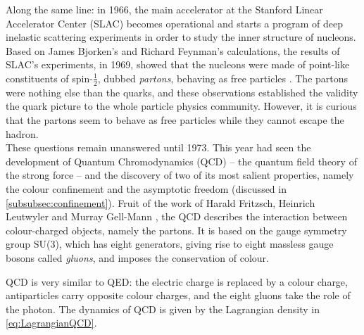 Along the same line: in 1966, the main accelerator at the Stanford Linear Accelerator Center (SLAC) becomes operational and starts a program of deep inelastic scattering experiments in order to study the inner structure of nucleons. Based on James Bjorken's \cite{bjorkenCurrentAlgebraSmall2018} and Richard Feynman's  \cite{feynmanBehaviorHadronCollisions1988} calculations, the results of SLAC's experiments, in 1969, showed that the nucleons were made of point-like constituents of spin-$\frac{1}{2}$, dubbed \textit{partons}, behaving as free particles \cite{peskinIntroductionQuantumField2018}. The partons were nothing else than the quarks, and these observations established the validity the quark picture to the whole particle physics community. However, it is curious that the partons seem to behave as free particles while they cannot escape the hadron.\\

These questions remain unanswered until 1973. This year had seen the development of Quantum Chromodynamics (QCD) -- the quantum field theory of the strong force -- and the discovery of two of its most salient properties, namely the colour confinement and the asymptotic freedom (discussed in \Sec\ref{subsubsec:confinement}). Fruit of the work of Harald Fritzsch, Heinrich Leutwyler and Murray Gell-Mann \cite{fritzschAdvantagesColorOctet1973}, the QCD describes the interaction between colour-charged objects, namely the partons. It is based on the gauge symmetry group SU(3), which has eight generators, giving rise to eight massless gauge bosons called \textit{gluons}, and imposes the conservation of colour. 

QCD is very similar to QED: the electric charge is replaced by a colour charge, antiparticles carry opposite colour charges, and the eight gluons take the role of the photon. The dynamics of QCD is given by the Lagrangian density in \eq\ref{eq:LagrangianQCD}.\\

